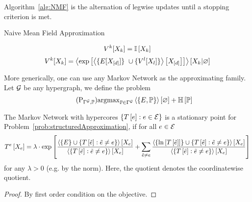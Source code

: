Algorithm~\ref{alg:NMF} is the alternation of legwise updates until a stopping criterion is met.

\begin{algorithm}[h!]
\caption{Naive Mean Field Approximation}\label{alg:NMF}
\begin{algorithmic}
\For{$\atomenumeratorin$}
	\State 
		\[ V^{k}[X_{k}] = \mathbb{I}\left[X_{k}\right]  \]
\EndFor
{}
	\For{$\atomenumeratorin$}
		\State 
			\[ \legcoreofat{\atomenumerator}{\catvariableof{\atomenumerator}} 
			= \normationofwrt{ \expof{ \contractionof{ \{\energytensor[\shortcatvariables] \} \cup
				\{\legcoreofat{\secatomenumerator}{\catvariableof{\secatomenumerator}}\} }{\shortcatvariables} }
			}{\catvariableof{\atomenumerator}}{\varnothing} \]
\EndFor
\EndWhile
\end{algorithmic}
\end{algorithm}


More generically, one can use any Markov Network as the approximating family. %
Let $\mathcal{G}$ be any hypergraph, we define the problem
\begin{align}\tag{$\mathrm{P}_{\mnexpfamily, \probtensor}$}\label{prob:structuredApproximation}
	\argmax_{\probtensor\in \mnexpfamily} \contractionof{\{\energytensor, \probtensor\}}{\varnothing} + \sentropyof{\probtensor}
\end{align}

\begin{theorem}
	The Markov Network with hypercores $\{ T\left[e\right] : e\in\mathcal{E} \}$ is a stationary point for Problem~\ref{prob:structuredApproximation}, if for all $e\in\mathcal{E}$
	\begin{align*}
	T^{e}\left[X_{e}\right]
	= \lambda\cdot \mathrm{exp}\left[
	\frac{
		\left\langle \{E\}\cup\{
		T\left[\tilde{e}\right] : \tilde{e}\neq e
		\}\right\rangle \left[ X_{e} \right] 
	}{
		\left\langle \{
		T\left[\tilde{e}\right] : \tilde{e}\neq e
		\}\right\rangle \left[ X_{e} \right] 
	}
	+ \sum_{\tilde{e}\neq e} 
		\frac{
		\left\langle \{\ln \left[ T\left[\tilde{e}\right] \right]\}\cup\{
		T\left[\tilde{e}\right] : \tilde{e}\neq e
		\}\right\rangle \left[ X_{e} \right] 
	}{
		\left\langle \{
		T\left[\tilde{e}\right] : \tilde{e}\neq e
		\}\right\rangle \left[ X_{e} \right] 
	}
	\right]
	\end{align*}
	for any $\lambda>0$ (e.g. by the norm).
	Here, the quotient denotes the coordinatewise quotient.
\end{theorem}
\begin{proof}
	By first order condition on the objective.
\end{proof}

